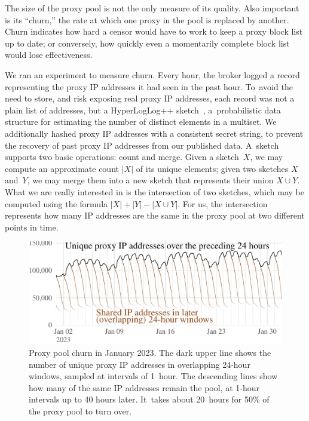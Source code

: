 \documentclass[letterpaper,twocolumn]{article}
\begin{document}

The size of the proxy pool is not the only measure of its quality.
Also important is its ``churn,'' the rate at which
one proxy in the pool is replaced by another.
Churn indicates how hard a censor would have to work
to keep a proxy block list up to date;
or conversely,
how quickly even a momentarily complete block list
would lose effectiveness.

We ran an experiment to measure churn.
Every hour, the broker logged a record representing
the proxy IP addresses it had seen in the past hour.
To~avoid the need to store, and risk exposing real proxy IP addresses,
each record was not a plain list of addresses,
but a HyperLogLog++ sketch~\cite{Heule2013a},
a~probabilistic data structure for estimating
the number of distinct elements in a multiset.
We additionally hashed proxy IP addresses with a consistent secret string,
to prevent the recovery of past proxy IP addresses from our published data.
A~sketch supports two basic operations: count and merge.
Given a sketch~\(X\),
we may compute an approximate count \(|X|\)
of its unique elements;
given two sketches \(X\) and~\(Y\),
we may merge them into a new sketch
that represents their union \(X \cup Y\).
What we are really interested in is the intersection
of two sketches, which may be computed using the formula
\(|X| + |Y| - |X \cup Y|\).
For us, the intersection represents
how many IP addresses are the same
in the proxy pool at two different points in time.

\begin{figure}
\includegraphics{figures/proxy-churn/proxy-count-decay}
\caption{
Proxy pool churn in January 2023.
The dark upper line shows the number
of unique proxy IP addresses in overlapping 24-hour windows,
sampled at intervals of 1~hour.
The descending lines show
how many of the same IP addresses remain the pool,
at 1-hour intervals up to 40 hours later.
It~takes about 20~hours for 50\% of the proxy pool to turn over.
}
\label{fig:proxy-count-decay}
\end{figure}
\end{document}

